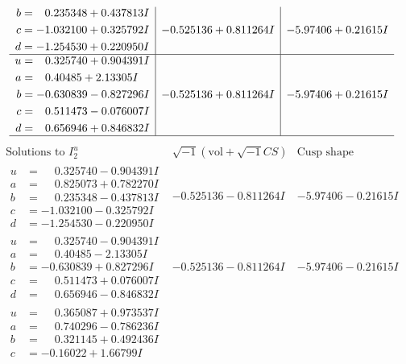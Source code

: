 \documentclass[1p]{elsarticle_modified}
\theoremstyle{definition}
\newcommand{\I}{\sqrt{-1}}
\begin{document}
$$\begin{array}{c|c|c}
\begin{aligned}
b &= \phantom{-}0.235348 + 0.437813 I \\
c &= -1.032100 + 0.325792 I \\
d &= -1.254530 + 0.220950 I\end{aligned}
 & -0.525136 + 0.811264 I & -5.97406 + 0.21615 I \\ \hline\begin{aligned}
u &= \phantom{-}0.325740 + 0.904391 I \\
a &= \phantom{-}0.40485 + 2.13305 I \\
b &= -0.630839 - 0.827296 I \\
c &= \phantom{-}0.511473 - 0.076007 I \\
d &= \phantom{-}0.656946 + 0.846832 I\end{aligned}
 & -0.525136 + 0.811264 I & -5.97406 + 0.21615 I\\
 \hline 
 \end{array}$$\newpage$$\begin{array}{c|c|c}  
\text{Solutions to }I^u_{2}& \I (\text{vol} + \sqrt{-1}CS) & \text{Cusp shape}\\
 \hline 
\begin{aligned}
u &= \phantom{-}0.325740 - 0.904391 I \\
a &= \phantom{-}0.825073 + 0.782270 I \\
b &= \phantom{-}0.235348 - 0.437813 I \\
c &= -1.032100 - 0.325792 I \\
d &= -1.254530 - 0.220950 I\end{aligned}
 & -0.525136 - 0.811264 I & -5.97406 - 0.21615 I \\ \hline\begin{aligned}
u &= \phantom{-}0.325740 - 0.904391 I \\
a &= \phantom{-}0.40485 - 2.13305 I \\
b &= -0.630839 + 0.827296 I \\
c &= \phantom{-}0.511473 + 0.076007 I \\
d &= \phantom{-}0.656946 - 0.846832 I\end{aligned}
 & -0.525136 - 0.811264 I & -5.97406 - 0.21615 I \\ \hline\begin{aligned}
u &= \phantom{-}0.365087 + 0.973537 I \\
a &= \phantom{-}0.740296 - 0.786236 I \\
b &= \phantom{-}0.321145 + 0.492436 I \\
c &= -0.16022 + 1.66799 I \\

\end{aligned}
\end{array}$$
\end{document}

